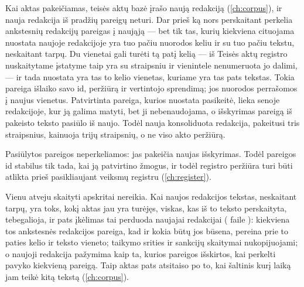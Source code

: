 Kai aktas pakeičiamas, teisės aktų bazė įrašo naują redakciją (\cref{ch:corpus}), ir nauja
redakcija iš pradžių pareigų neturi. Dar prieš ką nors perskaitant  perkelia
ankstesnių redakcijų  pareigas į naująją --- bet tik tas, kurių kiekviena
cituojama nuostata naujoje redakcijoje yra tuo pačiu nuorodos keliu ir su tuo pačiu tekstu,
neskaitant tarpų. Du vienetai gali turėti tą patį kelią --- iš Teisės aktų registro nuskaitytame
įstatyme taip yra su straipsniu ir vienintele nenumeruota jo dalimi, --- ir tada nuostata yra
tas to kelio vienetas, kuriame yra tas pats tekstas. Tokia pareiga išlaiko savo id, peržiūrą
ir vertintojo sprendimą; jos nuorodos
perrašomos į naujus vienetus. Patvirtinta pareiga, kurios nuostata pasikeitė, lieka senoje
redakcijoje, kur ją galima matyti, bet ji nebenaudojama, o išskyrimas pareigą iš pakeisto teksto
pasiūlo iš naujo. Todėl nauja konsoliduota redakcija, pakeitusi tris straipsnius, kainuoja trijų straipsnių, o
ne viso akto peržiūrą.

Pasiūlytos pareigos neperkeliamos: jas pakeičia naujas išskyrimas. Todėl pareigos id stabilus tik
tada, kai ją patvirtino žmogus, ir todėl registro peržiūra turi būti atlikta prieš pasikliaujant
veiksmų registru (\cref{ch:register}).

Vienu atveju skaityti apskritai nereikia. Kai naujos redakcijos tekstas, neskaitant tarpų, yra
toks, kokį aktas jau yra turėjęs, viskas, kas iš to teksto perskaityta, tebegalioja, ir pats
įkėlimas tai perduoda naujajai redakcijai ( faile ):
kiekviena tos ankstesnės redakcijos pareiga, kad ir kokia būtų jos būsena, pereina prie to
paties kelio ir teksto vieneto; taikymo srities ir sankcijų skaitymai nukopijuojami; o naujoji
redakcija pažymima kaip ta, kurios pareigos išskirtos, kai perkelti pavyko kiekvieną pareigą.
Taip aktas pats atsitaiso po to, kai šaltinis kurį laiką jam teikė kitą tekstą
(\cref{ch:corpus}).

